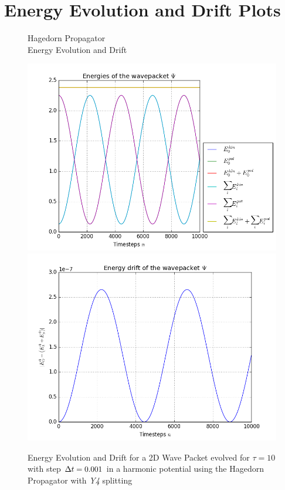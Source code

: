 \appendix

\section{Energy Evolution and Drift Plots}

\begin{figure}[ht]
	\begin{minipage}[c]{\textwidth}
		\begin{center}
			\large Hagedorn Propagator \\[1mm]
			\normalsize Energy Evolution and Drift
			\vspace{4mm}
		\end{center}
	\end{minipage}
	\includegraphics[width=.45\textwidth]{figures/energy_Hagedorn.png}
	\includegraphics[width=.45\textwidth]{figures/drift_Hagedorn.png}
	\caption{Energy Evolution and Drift for a 2D Wave Packet evolved for $\tau = 10$ with step $\Delta t = 0.001$ in a harmonic potential using the Hagedorn Propagator with \emph{Y4} splitting}
	\label{fig:energy_Hagedorn}
\end{figure}

